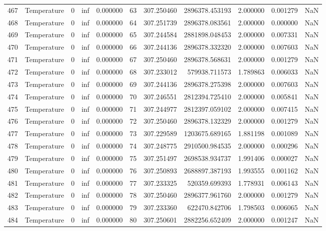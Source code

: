 \begin{tabular}{llrrrrrrrrr}
467 & Temperature & 0 & inf & 0.000000 & 63 & 307.250460 & 2896378.453193 & 2.000000 & 0.001279 & NaN \\
468 & Temperature & 0 & inf & 0.000000 & 64 & 307.251739 & 2896378.083561 & 2.000000 & 0.000000 & NaN \\
469 & Temperature & 0 & inf & 0.000000 & 65 & 307.244584 & 2881898.048453 & 2.000000 & 0.007331 & NaN \\
470 & Temperature & 0 & inf & 0.000000 & 66 & 307.244136 & 2896378.332320 & 2.000000 & 0.007603 & NaN \\
471 & Temperature & 0 & inf & 0.000000 & 67 & 307.250460 & 2896378.568631 & 2.000000 & 0.001279 & NaN \\
472 & Temperature & 0 & inf & 0.000000 & 68 & 307.233012 & 579938.711573 & 1.789863 & 0.006033 & NaN \\
473 & Temperature & 0 & inf & 0.000000 & 69 & 307.244136 & 2896378.275398 & 2.000000 & 0.007603 & NaN \\
474 & Temperature & 0 & inf & 0.000000 & 70 & 307.246551 & 2812394.725410 & 2.000000 & 0.005841 & NaN \\
475 & Temperature & 0 & inf & 0.000000 & 71 & 307.244977 & 2812397.059102 & 2.000000 & 0.007415 & NaN \\
476 & Temperature & 0 & inf & 0.000000 & 72 & 307.250460 & 2896378.132329 & 2.000000 & 0.001279 & NaN \\
477 & Temperature & 0 & inf & 0.000000 & 73 & 307.229589 & 1203675.689165 & 1.881198 & 0.001089 & NaN \\
478 & Temperature & 0 & inf & 0.000000 & 74 & 307.248775 & 2910500.984535 & 2.000000 & 0.000296 & NaN \\
479 & Temperature & 0 & inf & 0.000000 & 75 & 307.251497 & 2698538.934737 & 1.991406 & 0.000027 & NaN \\
480 & Temperature & 0 & inf & 0.000000 & 76 & 307.250893 & 2688897.387193 & 1.993555 & 0.001162 & NaN \\
481 & Temperature & 0 & inf & 0.000000 & 77 & 307.233325 & 520359.699393 & 1.778931 & 0.006143 & NaN \\
482 & Temperature & 0 & inf & 0.000000 & 78 & 307.250460 & 2896377.961760 & 2.000000 & 0.001279 & NaN \\
483 & Temperature & 0 & inf & 0.000000 & 79 & 307.233360 & 622470.842706 & 1.798503 & 0.006065 & NaN \\
484 & Temperature & 0 & inf & 0.000000 & 80 & 307.250601 & 2882256.652409 & 2.000000 & 0.001247 & NaN \\

\end{tabular}
